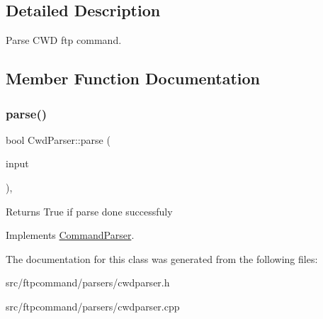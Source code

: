 \subsection{Detailed Description}
Parse C\+WD ftp command. 

\subsection{Member Function Documentation}
\mbox{\label{classCwdParser_a4037186e2a7229bc7499f138a559d47b}} 
\subsubsection{\texorpdfstring{parse()}{parse()}}
{\footnotesize\ttfamily bool Cwd\+Parser\+::parse (\begin{DoxyParamCaption}\item[{const Q\+String \&}]{input }\end{DoxyParamCaption})\hspace{0.3cm}{\ttfamily [override]}, {\ttfamily [virtual]}}

\begin{DoxyReturn}{Returns}
True if parse done successfuly 
\end{DoxyReturn}


Implements \hyperlink{classCommandParser_a5ed0855947a9b4500329f29b8123f2ea}{Command\+Parser}.



The documentation for this class was generated from the following files\+:\begin{DoxyCompactItemize}
\item 
src/ftpcommand/parsers/cwdparser.\+h\item 
src/ftpcommand/parsers/cwdparser.\+cpp\end{DoxyCompactItemize}
